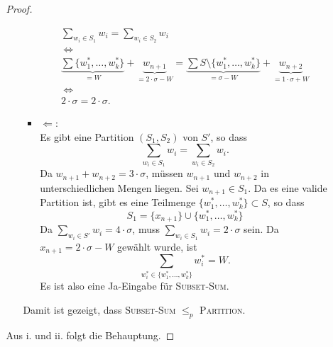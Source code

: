 \documentclass[a4paper]{scrartcl}
\newcommand{\gdw}{\ \Leftrightarrow\ }
\begin{document}
\begin{enumerate}[label=\bfseries \arabic*.]
\begin{enumerate}
\begin{proof}
\begin{enumerate}
\begin{itemize}
\begin{gather*}
                                \sum_{w_i \in S_1} w_i
                                =
                                \sum_{w_i \in S_2} w_i \\
                                \gdw \\
                                \underbrace{\sum \{w^\ast_1, \dotsc, w^\ast_k \}}_{= W}
                                + \underbrace{w_{n+1}}_{= 2 \cdot \sigma - W}
                                =
                                \underbrace{\sum S \setminus \{w^\ast_1, \dotsc, w^\ast_k \}}_{= \sigma - W}
                                + \underbrace{w_{n+2}}_{= 1 \cdot \sigma + W} \\
                                \gdw \\
                                2 \cdot \sigma = 2 \cdot \sigma
                                \text{.}
                            \end{gather*}

                        \item $\Leftarrow$: \\
                            Es gibt eine Partition $(S_1,S_2)$ von $S'$, so dass
                            \begin{equation*}
                                \sum_{w_i \in S_1} w_i
                                =
                                \sum_{w_i \in S_2} w_i
                                \text{.}
                            \end{equation*}
                            Da $w_{n+1} + w_{n+2} = 3 \cdot \sigma$, müssen
                            $w_{n+1}$ und $w_{n+2}$ in unterschiedlichen Mengen
                            liegen. Sei $w_{n+1} \in S_1$.
                            Da es eine valide Partition ist, gibt es eine Teilmenge $\{w^\ast_1, \dotsc, w^\ast_k\} \subset S$, so dass
                            \begin{equation*}
                                S_1 = \{x_{n+1}\} \cup \{w^\ast_1, \dotsc, w^\ast_k\}
                            \end{equation*}
                            Da $\sum_{w_i \in S'} w_i = 4 \cdot \sigma$, muss
                            $\sum_{w_i \in S_1} w_i = 2 \cdot \sigma$ sein.
                            Da $x_{n+1} = 2 \cdot \sigma - W$ gewählt wurde, ist
                            \begin{equation*}
                                \sum_{w^\ast_i \in \{w^\ast_1, \dotsc, w^\ast_k\}} w^\ast_i = W
                                \text{.}
                            \end{equation*}
                            Es ist also eine Ja-Eingabe für \textsc{Subset-Sum}.
                    \end{itemize}
                    Damit ist gezeigt, dass \textsc{Subset-Sum} $\leq_p$ \textsc{Partition}.
            \end{enumerate}
            Aus i. und ii. folgt die Behauptung.
        \end{proof}
\end{enumerate}


\end{enumerate}
\end{document}
